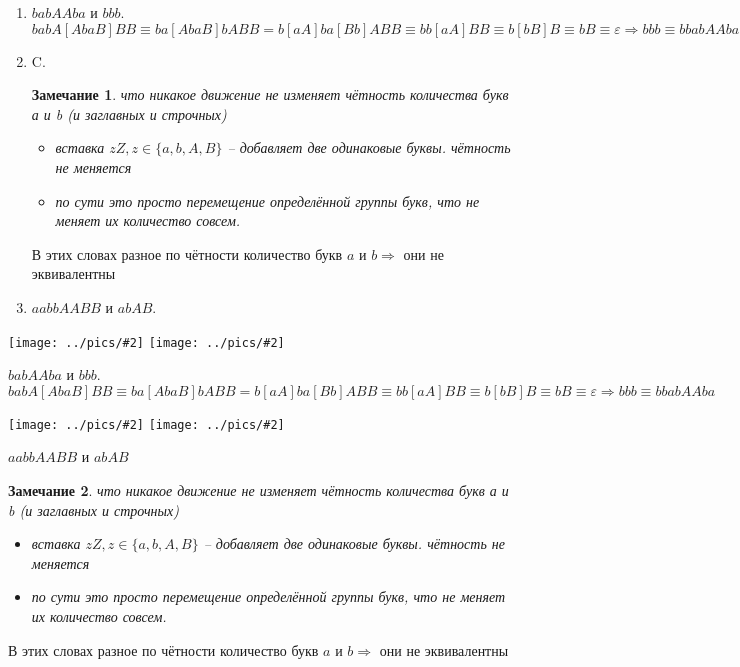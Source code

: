 \documentclass[12pt,a4paper, flushleft]{article}
\newtheorem{Zm}{Замечание}[section]
\newcommand{\gr}[2]{\texttt{[image: ../pics/\#2]}}
\begin{document}
\begin{enumerate}
	\item $babAAba$ и $bbb$. $babA[AbaB]BB\equiv ba[AbaB]bABB = b[aA]ba[Bb]ABB\equiv bb[aA]BB \equiv b[bB]B \equiv bB\equiv \varepsilon\Rightarrow bbb \equiv bbabAAba$
	\item C. 
	\begin{Zm}
	что никакое движение не изменяет чётность количества букв а и b (и заглавных и строчных)
	\begin{itemize}
		\item вставка $zZ, z\in \{a, b, A, B\}$ -- добавляет две одинаковые буквы. чётность не меняется
		\item по сути это просто перемещение определённой группы букв, что не меняет их количество совсем.
	\end{itemize}
	\end{Zm}
	В этих словах разное по чётности количество букв $a$ и $b\Rightarrow$ они не эквивалентны
	\item $aabbAABB$ и $abAB$.
	 
\end{enumerate}

\begin{multicols}{2}
\gr {0.25} {babAAba} \gr{0.25} {bbb}\columnbreak

$babAAba$ и $bbb$. 
$babA[AbaB]BB\equiv ba[AbaB]bABB = b[aA]ba[Bb]ABB\equiv bb[aA]BB \equiv b[bB]B \equiv bB\equiv \varepsilon\Rightarrow bbb \equiv bbabAAba$
\end{multicols}

\begin{multicols}{2}
\gr{0.25}{bbA} \gr {0.25} {aaB}\columnbreak

$aabbAABB$ и $abAB$
\begin{Zm}
	что никакое движение не изменяет чётность количества букв а и b (и заглавных и строчных)
	\begin{itemize}
		\item вставка $zZ, z\in \{a, b, A, B\}$ -- добавляет две одинаковые буквы. чётность не меняется
		\item по сути это просто перемещение определённой группы букв, что не меняет их количество совсем.
	\end{itemize}
	\end{Zm}
	В этих словах разное по чётности количество букв $a$ и $b\Rightarrow$ они не эквивалентны
\end{multicols}
\end{document}
